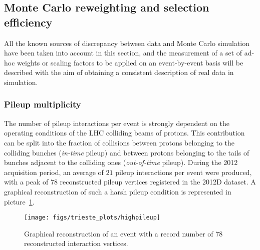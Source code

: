 \subsection{Monte Carlo reweighting and selection efficiency}
\label{sec:scalefactors}

All the known sources of discrepancy between data and Monte Carlo simulation 
have been taken into account in this section, and the 
measurement of a set of ad-hoc weights or scaling factors to be applied on an 
event-by-event basis 
will be described with the aim of
obtaining a consistent description 
of real data in simulation.

\subsubsection{Pileup multiplicity}
\label{sec:pileupreweight}

The number of pileup interactions 
per event is strongly dependent on the operating 
conditions of the LHC colliding beams of protons.
This contribution can be split into the fraction of collisions 
between protons belonging to the colliding bunches (\textit{in-time} 
pileup) and between protons belonging to the tails of bunches adjacent 
to the colliding ones (\textit{out-of-time} pileup).
During the 2012 acquisition period, an average of $21$ pileup interactions per 
event were produced, with a peak of $78$ reconstructed pileup vertices 
registered in the 2012D dataset.
A graphical reconstruction of such a harsh pileup condition is represented in 
picture~\ref{fig:highpileup}.

\begin{figure}[htb]
	\begin{center}
		\leavevmode
		\texttt{[image: figs/trieste\_plots/highpileup]}
	\end{center}
	\caption{Graphical reconstruction of an event with a record number 
          of $78$ reconstructed interaction vertices.}
	\label{fig:highpileup}
\end{figure}

